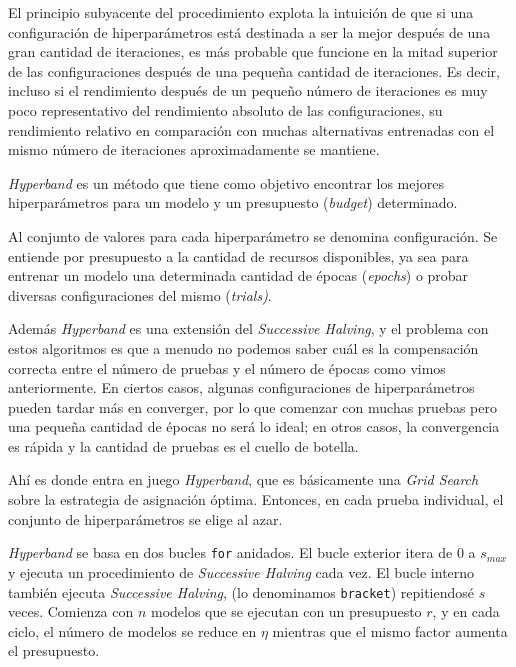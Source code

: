 \documentclass[a4paper,12pt]{article}
\begin{document}
El principio subyacente del procedimiento explota la intuición de que si una configuración de hiperparámetros está destinada a ser la mejor después de una gran cantidad de iteraciones, es más probable que funcione en la mitad superior de las configuraciones después de una pequeña cantidad de iteraciones. Es decir, incluso si el rendimiento después de un pequeño número de iteraciones es muy poco representativo del rendimiento absoluto de las configuraciones, su rendimiento relativo en comparación con muchas alternativas entrenadas con el mismo número de iteraciones aproximadamente se mantiene.

\textit{Hyperband} es un método que tiene como objetivo encontrar los mejores hiperparámetros para un modelo y un presupuesto (\textit{budget}) determinado. 

Al conjunto de valores para cada hiperparámetro se denomina configuración. Se entiende por presupuesto a la cantidad de recursos disponibles, ya sea para entrenar un modelo una determinada cantidad de épocas (\textit{epochs}) o probar diversas configuraciones del mismo (\textit{trials)}. 

Además \textit{Hyperband} es una extensión del \textit{Successive Halving}, y el problema con estos algoritmos es que a menudo no podemos saber cuál es la compensación correcta entre el número de pruebas y el número de épocas como vimos anteriormente. En ciertos casos, algunas configuraciones de hiperparámetros pueden tardar más en converger, por lo que comenzar con muchas pruebas pero una pequeña cantidad de épocas no será lo ideal; en otros casos, la convergencia es rápida y la cantidad de pruebas es el cuello de botella. \citep{Rosenberg2020Aug}

Ahí es donde entra en juego \textit{Hyperband}, que es básicamente una \textit{Grid Search} sobre la estrategia de asignación óptima. Entonces, en cada prueba individual, el conjunto de hiperparámetros se elige al azar.

\textit{Hyperband} se basa en dos bucles \texttt{for} anidados. El bucle exterior itera de $0$ a $s_{max}$ y ejecuta un procedimiento de \textit{Successive Halving} cada vez. El bucle interno también ejecuta \textit{Successive Halving}, (lo denominamos \texttt{bracket}) repitiendosé $s$ veces. Comienza con $n$ modelos que se ejecutan con un presupuesto $r$, y en cada ciclo, el número de modelos se reduce en $\eta$ mientras que el mismo factor aumenta el presupuesto. \citep{Abraham2021Feb}
\end{document}
